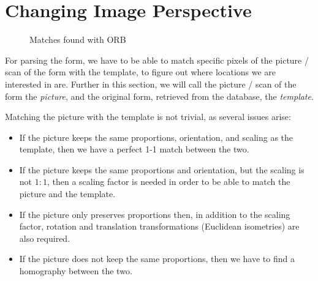 \documentclass[11pt, a4paper]{report}
\begin{document}
\section{Changing Image Perspective}


 \begin{figure}[!h]
     \centering
     \caption{Matches found with ORB}
     \label{orb-matches}
 \end{figure}

For parsing the form, we have to be able to match specific pixels of the picture / scan of the form with the template, to figure out where locations we are interested in are. Further in this section, we will call the picture / scan of the form the \textit{picture}, and the original form, retrieved from the database, the \textit{template}.

Matching the picture with the template is not trivial, as several issues arise:
\begin{itemize}
    \item If the picture keeps the same proportions, orientation, and scaling as the template, then we have a perfect 1-1 match between the two.
    \item If the picture keeps the same proportions and orientation, but the scaling is not $1:1$, then a scaling factor is needed in order to be able to match the picture and the template.
    \item If the picture only preserves proportions then, in addition to the scaling factor,  rotation and translation transformations (Euclidean isometries) are also required.
    \item If the picture does not keep the same proportions, then we have to find a homography between the two.
\end{itemize}
\end{document}
